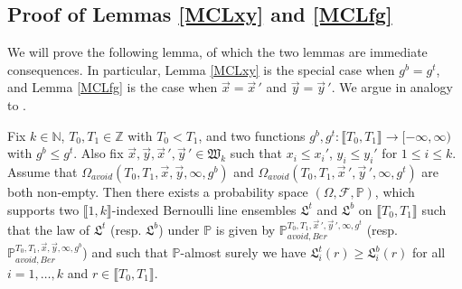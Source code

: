 \subsection{Proof of Lemmas \ref{MCLxy} and \ref{MCLfg}}

We will prove the following lemma, of which the two lemmas are immediate consequences. In particular, Lemma \ref{MCLxy} is the special case when $g^b = g^t$, and Lemma \ref{MCLfg} is the case when $\vec{x} = \vec{x}\,'$ and $\vec{y} = \vec{y}\,'$. We argue in analogy to \cite[Lemma 5.6]{DimMat}.

\begin{lemma}
	Fix $k \in \mathbb{N}$, $T_0, T_1 \in \mathbb{Z}$ with $T_0 < T_1$, and two functions $g^b, g^t: \llbracket T_0, T_1 \rrbracket  \rightarrow [-\infty, \infty)$ with $g^b\leq g^t$. Also fix $\vec{x}, \vec{y}, \vec{x}\,', \vec{y}\,' \in \mathfrak{W}_k$ such that $x_i\leq x_i'$, $y_i\leq y_i'$ for $1\leq i\leq k$. Assume that $\Omega_{avoid}(T_0, T_1, \vec{x}, \vec{y}, \infty,g^b)$ and $\Omega_{avoid}(T_0, T_1, \vec{x}\,', \vec{y}\,', \infty,g^t)$ are both non-empty. Then there exists a probability space $(\Omega, \mathcal{F}, \mathbb{P})$, which supports two $\llbracket 1, k \rrbracket$-indexed Bernoulli line ensembles $\mathfrak{L}^t$ and $\mathfrak{L}^b$ on $\llbracket T_0, T_1 \rrbracket$ such that the law of $\mathfrak{L}^{t}$ {\big (}resp. $\mathfrak{L}^b${\big )} under $\mathbb{P}$ is given by $\mathbb{P}_{avoid, Ber}^{T_0, T_1, \vec{x}\,', \vec{y}\,', \infty, g^t}$ {\big (}resp. $\mathbb{P}_{avoid, Ber}^{T_0, T_1, \vec{x}, \vec{y}, \infty, g^b}${\big )} and such that $\mathbb{P}$-almost surely we have $\mathfrak{L}_i^t(r) \geq \mathfrak{L}^b_i(r)$ for all $i = 1,\dots, k$ and $r \in \llbracket T_0, T_1 \rrbracket$.
\end{lemma}


